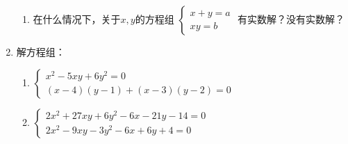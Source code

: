 \begin{enumerate}
\begin{enumerate}
\item 在什么情况下，关于$x,y$的方程组
$\begin{cases}
    x+y=a\\xy=b
\end{cases}$
有实数解？没有实数解？
\end{enumerate}


\item 解方程组：
\begin{enumerate}
    \item $\begin{cases}
        x^2-5xy+6y^2=0\\
        (x-4)(y-1)+(x-3)(y-2)=0
    \end{cases}$
    \item $\begin{cases}
        2x^2+27xy+6y^2-6x-21y-14=0\\
        2x^2-9xy-3y^2-6x+6y+4=0
    \end{cases}$
\end{enumerate}



\end{enumerate}
